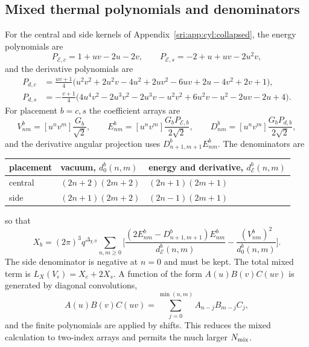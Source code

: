 \subsection{Mixed thermal polynomials and denominators}\label{sri:app:cyl:mixed}
For the central and side kernels of Appendix~\ref{sri:app:cyl:collapsed}, the energy polynomials are
\begin{equation}
 P_{\mathcal E,c}=1+uv-2u-2v,\qquad P_{\mathcal E,s}=-2+u+uv-2u^2v,
\end{equation}
and the derivative polynomials are
\begin{equation}
\begin{aligned}
 P_{d,c}&=\frac{uv+1}{4}\bigl(u^2v^2+2u^2v-4u^2+2uv^2-6uv+2u-4v^2+2v+1\bigr),\\
 P_{d,s}&=-\frac{v+1}{4}\bigl(4u^4v^2-2u^3v^2-2u^3v-u^2v^2+6u^2v-u^2-2uv-2u+4\bigr).
\end{aligned}
\label{sri:eq:cyl:mixedpolys}
\end{equation}
For placement $b=c,s$ the coefficient arrays are
\begin{equation}
 V^b_{nm}=[u^nv^m]\frac{G_b}{\sqrt2},\qquad E^b_{nm}=[u^nv^m]\frac{G_bP_{\mathcal E,b}}{2\sqrt2},\qquad
 D^b_{nm}=[u^nv^m]\frac{G_bP_{d,b}}{2\sqrt2},
\end{equation}
and the derivative angular projection uses $D^b_{n+1,m+1}E^b_{nm}$. The denominators are
\begin{center}\small
\begin{tabular}{@{}lll@{}}
\toprule
placement & vacuum, $d^b_0(n,m)$ & energy and derivative, $d^b_{\mathcal E}(n,m)$\\
\midrule
central & $(2n+2)(2m+2)$ & $(2n+1)(2m+1)$\\
side & $(2n+1)(2m+2)$ & $(2n-1)(2m+1)$\\
\bottomrule
\end{tabular}
\end{center}
so that
\begin{equation}
 X_b=(2\pi)^3q^{\Delta_{\chi,0}}\sum_{n,m\ge0}\biggl[\frac{(2E^b_{nm}-D^b_{n+1,m+1})E^b_{nm}}{d^b_{\mathcal E}(n,m)}
 -\frac{(V^b_{nm})^2}{d^b_0(n,m)}\biggr].
\end{equation}
The side denominator is negative at $n=0$ and must be kept. The total mixed term is $L_X(V_\epsilon)=X_c+2X_s$. A
function of the form $A(u)B(v)C(uv)$ is generated by diagonal convolutions,
\begin{equation}
 [u^nv^m]A(u)B(v)C(uv)=\sum_{j=0}^{\min(n,m)}A_{n-j}B_{m-j}C_j,
 \label{sri:eq:cyl:diagconv}
\end{equation}
and the finite polynomials are applied by shifts. This reduces the mixed calculation to two-index arrays and permits
the much larger $N_{\rm mix}$.

